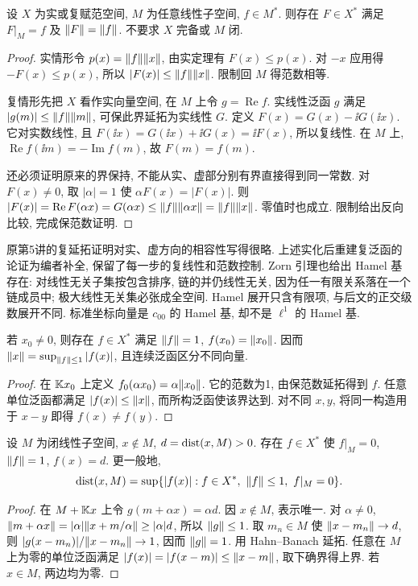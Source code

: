 \begin{theorem}[保范数延拓]\label{thm:hb}
设 $X$ 为实或复赋范空间, $M$ 为任意线性子空间, $f\in M^*$. 则存在 $F\in X^*$ 满足 $F|_M=f$ 及 $\lVert F\rVert=\lVert f\rVert$. 不要求 $X$ 完备或 $M$ 闭.
\end{theorem}
\begin{proof}
实情形令 $p(x)=\lVert f\rVert\lVert x\rVert$, 由实定理有 $F(x)\le p(x)$. 对 $-x$ 应用得 $-F(x)\le p(x)$, 所以 $|F(x)|\le\lVert f\rVert\lVert x\rVert$. 限制回 $M$ 得范数相等.

复情形先把 $X$ 看作实向量空间, 在 $M$ 上令 $g=\operatorname{Re}f$. 实线性泛函 $g$ 满足 $|g(m)|\le\lVert f\rVert\lVert m\rVert$, 可保此界延拓为实线性 $G$. 定义
$F(x)=G(x)-\ii G(\ii x)$. 它对实数线性, 且
$F(\ii x)=G(\ii x)+\ii G(x)=\ii F(x)$, 所以复线性. 在 $M$ 上, $\operatorname{Re}f(\ii m)=-\operatorname{Im}f(m)$, 故 $F(m)=f(m)$.

还必须证明原来的界保持, 不能从实、虚部分别有界直接得到同一常数. 对 $F(x)\ne0$, 取 $|\alpha|=1$ 使 $\alpha F(x)=|F(x)|$. 则 $|F(x)|=\operatorname{Re}F(\alpha x)=G(\alpha x)\le\lVert f\rVert\lVert \alpha x\rVert=\lVert f\rVert\lVert x\rVert$. 零值时也成立. 限制给出反向比较, 完成保范数证明.
\end{proof}

\begin{remark}
原第5讲的复延拓证明对实、虚方向的相容性写得很略. 上述实化后重建复泛函的论证为编者补全, 保留了每一步的复线性和范数控制. Zorn 引理也给出 Hamel 基存在: 对线性无关子集按包含排序, 链的并仍线性无关, 因为任一有限关系落在一个链成员中; 极大线性无关集必张成全空间. Hamel 展开只含有限项, 与后文的正交级数展开不同. 标准坐标向量是 $c_{00}$ 的 Hamel 基, 却不是 $\ell^1$ 的 Hamel 基.
\end{remark}

\begin{corollary}\label{cor:norming}
若 $x_0\ne0$, 则存在 $f\in X^*$ 满足 $\lVert f\rVert=1$, $f(x_0)=\lVert x_0\rVert$. 因而 $\lVert x\rVert=\sup_{\lVert f\rVert\le1}|f(x)|$, 且连续泛函区分不同向量.
\end{corollary}
\begin{proof}
在 $\mathbb K x_0$ 上定义 $f_0(\alpha x_0)=\alpha\lVert x_0\rVert$. 它的范数为1, 由保范数延拓得到 $f$. 任意单位泛函都满足 $|f(x)|\le\lVert x\rVert$, 而所构泛函使该界达到. 对不同 $x,y$, 将同一构造用于 $x-y$ 即得 $f(x)\ne f(y)$.
\end{proof}

\begin{theorem}\label{thm:distance-dual}
设 $M$ 为闭线性子空间, $x\notin M$, $d=\operatorname{dist}(x,M)>0$. 存在 $f\in X^*$ 使 $f|_M=0$, $\lVert f\rVert=1$, $f(x)=d$. 更一般地,
\[
\operatorname{dist}(x,M)=\sup\{|f(x)|:f\in X^*,\ \lVert f\rVert\le1,\ f|_M=0\}.
\]
\end{theorem}
\begin{proof}
在 $M+\mathbb K x$ 上令 $g(m+\alpha x)=\alpha d$. 因 $x\notin M$, 表示唯一. 对 $\alpha\ne0$,
$\lVert m+\alpha x\rVert=|\alpha|\lVert x+m/\alpha\rVert\ge|\alpha|d$, 所以 $\lVert g\rVert\le1$. 取 $m_n\in M$ 使 $\lVert x-m_n\rVert\to d$, 则 $|g(x-m_n)|/\lVert x-m_n\rVert\to1$, 因而 $\lVert g\rVert=1$. 用 Hahn--Banach 延拓. 任意在 $M$ 上为零的单位泛函满足 $|f(x)|=|f(x-m)|\le\lVert x-m\rVert$, 取下确界得上界. 若 $x\in M$, 两边均为零.
\end{proof}

